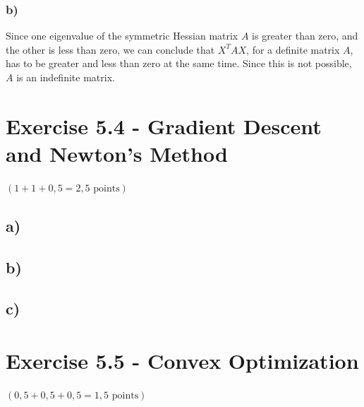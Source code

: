 \documentclass[a4paper]{article}
\begin{document}
        \subsubsection*{b)}
            Since one eigenvalue of the symmetric Hessian matrix $A$ is greater than zero, and the other is less than zero, we can conclude that $X^T A X$, for a definite matrix $A$, has to be greater and less than zero at the same time.
            Since this is not possible, $A$ is an indefinite matrix.
            


\newpage
\section*{Exercise 5.4 - Gradient Descent and Newton's Method}
$(1+1+0,5 = 2,5 \text{ points})$
    \subsection*{a)}
        
        
        
    \subsection*{b)}
        
        
        
    \subsection*{c)}
    
    



\newpage
\section*{Exercise 5.5 - Convex Optimization}
$(0,5+0,5+0,5 = 1,5 \text{ points})$
\end{document}
